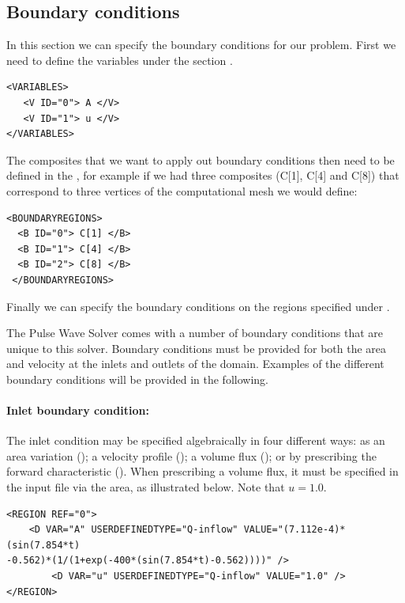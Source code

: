 \subsection{Boundary conditions}
In this section we can specify the boundary conditions for our problem.
First we need to define the variables under the section .
\begin{lstlisting}[style=XmlStyle]        
<VARIABLES>
   <V ID="0"> A </V>
   <V ID="1"> u </V>
</VARIABLES>
\end{lstlisting}

The composites that we want to apply out boundary conditions then need to be defined in the , for example if we had three composites (C[1], C[4] and C[8]) that correspond to three vertices of the computational mesh we would define:
\begin{lstlisting}[style=XmlStyle]        
<BOUNDARYREGIONS>
  <B ID="0"> C[1] </B>
  <B ID="1"> C[4] </B>
  <B ID="2"> C[8] </B>
 </BOUNDARYREGIONS>
\end{lstlisting}

Finally we can specify the boundary conditions on the regions specified under .

The Pulse Wave Solver comes with a number of boundary conditions that are unique to this solver. Boundary conditions must be provided for both the area and velocity at the inlets and outlets of the domain. Examples of the different boundary conditions will be provided in the following.

\paragraph{Inlet boundary condition:~} The inlet condition may be specified algebraically in four different ways: as an area variation (); a velocity profile (); a volume flux (); or by prescribing the forward characteristic (). When prescribing a volume flux, it must be specified in the input file via the area, as illustrated below. Note that $u = 1.0$.

\begin{lstlisting}[style=XmlStyle]
<REGION REF="0">
	<D VAR="A" USERDEFINEDTYPE="Q-inflow" VALUE="(7.112e-4)*(sin(7.854*t) 
-0.562)*(1/(1+exp(-400*(sin(7.854*t)-0.562))))" />
        <D VAR="u" USERDEFINEDTYPE="Q-inflow" VALUE="1.0" />
</REGION>
\end{lstlisting}

